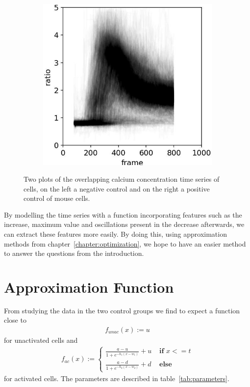 \begin{figure}[h]
\begin{subfigure}{0.45\linewidth}
		\includegraphics[width=\textwidth]{fig/all_cells_overlayed_mouse_pos}
	\end{subfigure}
	
	\caption{Two plots of the overlapping calcium concentration time series of cells, on the left a negative control and on the right a positive control of mouse cells.}
	\label{fig:all_cells_overlayed}
\end{figure}

By modelling the time series with a function incorporating features such as the increase, maximum value and oscillations present in the decrease afterwards, we can extract these features more easily. By doing this, using approximation methods from chapter~\ref{chapter:optimization}, we hope to have an easier method to answer the questions from the introduction.

\section{Approximation Function}

From studying the data in the two control groups we find to expect a function close to
\begin{align}
	\label{math:function_unactivated_cell}
	f_{unac}(x) := u
\end{align}
for unactivated cells and
\begin{align}
	\label{math:function_activated_cell}
	f_{ac}(x) := \begin{cases}
		\frac{a-u}{1 + e^{-k_1(x-w_1)}} + u & \textbf{ if } x <= t\\
		\frac{a-d}{1 + e^{-k_2(x-w_2)}} + d & \textbf{ else}
	\end{cases}
\end{align}
for activated cells. The parameters are described in table~\ref{tab:parameters}.

